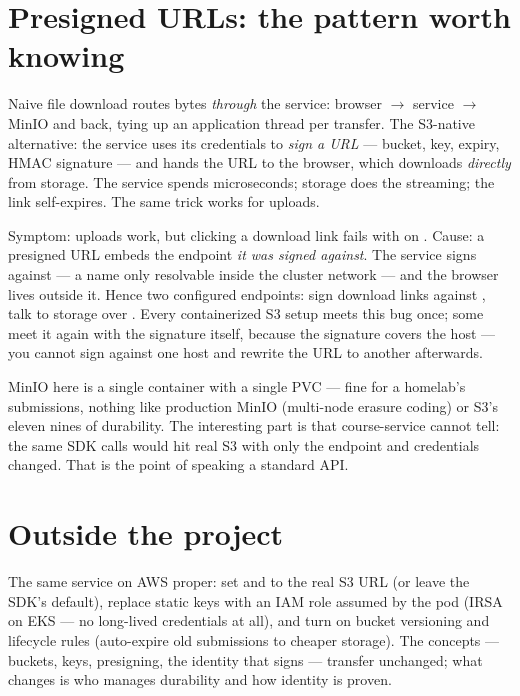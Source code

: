 \section{Presigned URLs: the pattern worth knowing}

Naive file download routes bytes \emph{through} the service:
browser $\rightarrow$ service $\rightarrow$ MinIO and back, tying up an
application thread per transfer. The S3-native alternative: the service
uses its credentials to \emph{sign a URL} --- bucket, key, expiry, HMAC
signature --- and hands the URL to the browser, which downloads
\emph{directly} from storage. The service spends microseconds; storage
does the streaming; the link self-expires. The same trick works for
uploads.

\begin{pitfall}
Symptom: uploads work, but clicking a download link fails with
 on . Cause: a presigned
URL embeds the endpoint \emph{it was signed against}. The service signs
against  --- a name only resolvable inside the cluster
network --- and the browser lives outside it. Hence two configured
endpoints: sign download links against , talk to
storage over . Every containerized S3 setup meets this
bug once; some meet it again with the signature itself, because the
signature covers the host --- you cannot sign against one host and
rewrite the URL to another afterwards.
\end{pitfall}

\begin{hardware}
MinIO here is a single container with a single PVC --- fine for a
homelab's submissions, nothing like production MinIO (multi-node erasure
coding) or S3's eleven nines of durability. The interesting part is that
course-service cannot tell: the same SDK calls would hit real S3 with
only the endpoint and credentials changed. That is the point of speaking
a standard API.
\end{hardware}

\section{Outside the project}

The same service on AWS proper: set  and
 to the real S3 URL (or leave the SDK's default),
replace static keys with an IAM role assumed by the pod (IRSA on EKS ---
no long-lived credentials at all), and turn on bucket versioning and
lifecycle rules (auto-expire old submissions to cheaper storage). The
concepts --- buckets, keys, presigning, the identity that signs ---
transfer unchanged; what changes is who manages durability and how
identity is proven.

